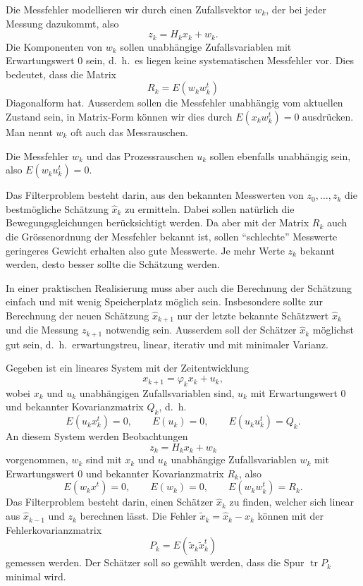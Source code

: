 Die Messfehler modellieren wir durch einen
Zufallsvektor $w_k$, der bei jeder Messung dazukommt, also
\[
z_k=H_kx_k+w_k.
\]
Die Komponenten von $w_k$ sollen unabhängige Zufallsvariablen mit
Erwartungswert $0$ sein, d.~h.~es liegen keine systematischen Messfehler
vor.
Dies bedeutet, dass die Matrix
\[
R_k=E(w_kw_k^t)
\]
Diagonalform hat.
Ausserdem sollen die Messfehler unabhängig vom aktuellen Zustand
sein, in Matrix-Form können wir dies durch $E(x_kw_k^t)=0$ ausdrücken.
Man nennt $w_k$ oft auch das Messrauschen.

Die Messfehler $w_k$ und das Prozessrauschen $u_k$ sollen ebenfalls unabhängig
sein, also $E(w_ku_k^t)=0$.

Das Filterproblem besteht darin, aus den bekannten Messwerten von $z_0,\dots,z_k$
die bestmögliche Schätzung $\hat x_k$ zu ermitteln.
Dabei sollen
natürlich die Bewegungsgleichungen berücksichtigt werden.
Da aber
mit der Matrix $R_k$ auch die Grössenordnung der Messfehler bekannt ist,
sollen ``schlechte'' Messwerte geringeres Gewicht erhalten also gute
Messwerte.
Je mehr Werte $z_k$ bekannt werden, desto besser sollte die
Schätzung werden.

In einer praktischen Realisierung muss aber auch die Berechnung der Schätzung
einfach und mit wenig Speicherplatz möglich sein.
Insbesondere sollte zur
Berechnung der neuen Schätzung $\hat x_{k+1}$ nur der letzte bekannte Schätzwert
$\hat x_k$ und die Messung $z_{k+1}$ notwendig sein.
Ausserdem soll der Schätzer
$\hat x_k$ möglichst gut sein, d.~h.~erwartungstreu, linear, iterativ und
mit minimaler Varianz.

\begin{definition}Gegeben ist ein lineares System mit der Zeitentwicklung
\[
x_{k+1}=\varphi_kx_k+u_k,
\]
wobei $x_k$ und $u_k$ unabhängigen Zufallsvariablen sind,
$u_k$ mit Erwartungswert $0$ und bekannter Kovarianzmatrix $Q_k$, d.~h.
\[
E(u_kx_k^t)=0,\qquad E(u_k)=0,\qquad E(u_ku_k^t)=Q_k.
\]
An diesem System werden Beobachtungen
\[
z_k=H_kx_k+w_k
\]
vorgenommen, $w_k$ sind mit $x_k$ und $u_k$ unabhängige Zufallsvariablen
$w_k$ mit Erwartungswert $0$ und bekannter Kovarianzmatrix $R_k$, also
\[
E(w_kx^t)=0,\qquad E(w_k)=0,\qquad E(w_kw_k^t)=R_k.
\]
Das Filterproblem besteht darin, einen Schätzer $\hat x_k$ zu
finden, welcher sich linear aus $\hat x_{k-1}$ und $z_k$ berechnen lässt.
Die Fehler $\tilde x_k=\hat x_k-x_k$ können mit der Fehlerkovarianzmatrix
\[
P_k=E(\tilde x_k\tilde x_k^t)
\]
gemessen werden.
Der Schätzer soll so gewählt werden, dass die Spur
$\operatorname{tr}P_k$ minimal wird.
\end{definition}

